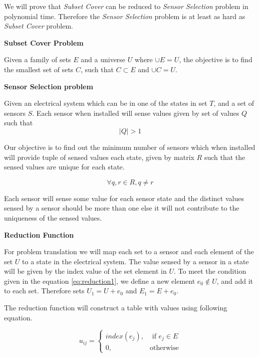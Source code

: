We will prove that \textit{Subset Cover} can be reduced to \textit{Sensor Selection} problem in polynomial time. Therefore the \textit{Sensor Selection} problem is at least as hard as \textit{Subset Cover} problem.

    \textbf{Subset Cover Problem}

Given a family of sets $E$ and a universe $U$ where $\cup E = U$, the objective is to find the smallest set of sets $C$, such that $C \subset E$ and $\cup C = U$.

	\textbf{Sensor Selection problem}

Given an electrical system which can be in one of the states in set $T$, and a set of sensors $S$. Each sensor when installed will sense values given by set of values $Q$ such that
\begin{equation} \label{eq:reduction1}
|Q|>1
\end{equation}

Our objective is to find out the minimum number of sensors which when installed will provide tuple of sensed values each state, given by matrix $R$ such that the sensed values are unique for each state.

\begin{equation} \label{eq:reduction2}
\forall q,r \in R, q \ne r
\end{equation}

Each sensor will sense some value for each sensor state and the distinct values sensed by a sensor should be more than one else it will not contribute to the uniqueness of the sensed values.

\textbf{Reduction Function }

For problem translation we will map each set to a sensor and each element of the set $U$ to a state in the electrical system. The value sensed by a sensor in a state will be given by the index value of the set element in $U$.
To meet the condition given in the equation \ref{eq:reduction1}, we define a new element $e_0 \notin U$, and add it to each set.
Therefore sets $U_1 = U + e_0$  and $E_1 = E + e_0$.

The reduction function will construct a table with values using following equation.

\begin{equation*}
u_{ij} = \begin{cases}    index(e_j),& \text{ if } e_j \in E \\    0,& \text{otherwise} \end{cases}
\end{equation*}

